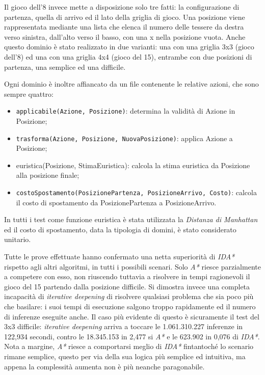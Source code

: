 \documentclass[a4paper,oneside,12pt]{book}
\def \code#1{\texttt{#1}}
\begin{document}
	Il gioco dell’8 invece mette a disposizione solo tre fatti: la configurazione di partenza, quella di arrivo ed il lato della griglia di gioco. Una posizione viene rappresentata mediante una lista che elenca il numero delle tessere da destra verso sinistra, dall’alto verso il basso, con una x nella posizione vuota. Anche questo dominio è stato realizzato in due varianti: una con una griglia 3x3 (gioco dell’8) ed una con una griglia 4x4 (gioco del 15), entrambe con due posizioni di partenza, una semplice ed una difficile.

	Ogni dominio è inoltre affiancato da un file contenente le relative azioni, che sono sempre quattro:

	\begin{itemize}
		\item \code{applicabile(Azione, Posizione)}: determina la validità di Azione in Posizione;
		\item \code{trasforma(Azione, Posizione, NuovaPosizione)}: applica Azione a Posizione;
		\item euristica(Posizione, StimaEuristica): calcola la stima euristica da Posizione alla posizione finale;
		\item \code{costoSpostamento(PosizionePartenza, PosizioneArrivo, Costo)}: calcola il costo di spostamento da PosizionePartenza a PosizioneArrivo.
	\end{itemize}
	In tutti i test come funzione euristica è stata utilizzata la \textit{Distanza di Manhattan} ed il costo di spostamento, data la tipologia di domini, è stato considerato unitario.

	Tutte le prove effettuate hanno confermato una netta superiorità di \textit{IDA*} rispetto agli altri algoritmi, in tutti i possibili scenari. Solo \textit{A*} riesce parzialmente a competere con esso, non riuscendo tuttavia a risolvere in tempi ragionevoli il gioco del 15 partendo dalla posizione difficile. Si dimostra invece una completa incapacità di \textit{iterative deepening} di risolvere qualsiasi problema che sia poco più che basilare: i suoi tempi di esecuzione salgono troppo rapidamente ed il numero di inferenze eseguite anche. Il caso più evidente di questo è sicuramente il test del 3x3 difficile: \textit{iterative deepening} arriva a toccare le 1.061.310.227 inferenze in 122,934 secondi, contro le 18.345.153 in 2,477 si \textit{A*} e le 623.902 in 0,076 di \textit{IDA*}. Nota a margine, \textit{A*} riesce a comportarsi meglio di \textit{IDA*} fintantoché lo scenario rimane semplice, questo per via della sua logica più semplice ed intuitiva, ma appena la complessità aumenta non è più neanche paragonabile.
\end{document}
